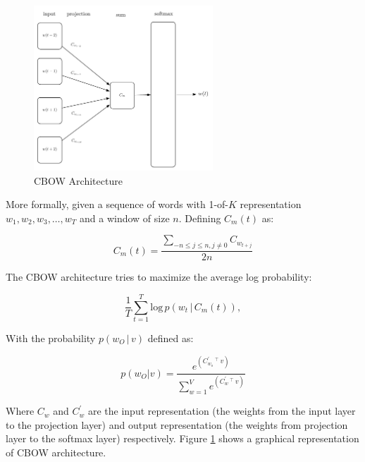 \begin{figure}[hptb!]
    \centering
    \includegraphics[width=0.6\textwidth]{images/word2vec-cbow-latex.pdf} 
    \caption{CBOW Architecture}
    \label{fig:cbow-architecture-alone}
\end{figure}

More formally, given a sequence of words with 1-of-$K$ representation $w_1,w_2,w_3, \dots, w_T$ and a window
of size $n$. Defining $C_m(t)$ as:

\begin{equation}
\label{eq:cbow-mean}
   C_{m}(t) =    \frac{\sum_{-n \leq j \leq n, j \neq 0} { 
       C_{w_{t+j}}} } {2n}    
\end{equation}

The  \ac{CBOW} architecture  tries to maximize the average log probability:


\begin{equation}
  \label{eq:logprob-cbow}
   \frac{1}{T} \sum^{T}_{t=1} \text{log} \, p
     \left( w_t \, |\, C_{m}(t) \right),
\end{equation}



With the probability  $p\left( w_O \, |\, v \right)$  defined as:

\begin{equation}
  \label{eq:logp-cbow}
  p(w_O|v) = \frac{e^{\left(C^{'}_{w_o}\,^\top\,v \right)}
  }{\sum^{V}_{w=1} e^{ \left( C^{'}_w \,^\top\, v \right)  } }  
\end{equation}


Where $C_w$ and $C^{'}_w$ are the input representation (the weights from the input layer to the
projection layer) and output representation (the weights from
projection layer to the softmax layer) respectively.   Figure
\ref{fig:cbow-architecture-alone} shows a graphical representation of
\ac{CBOW} architecture.

